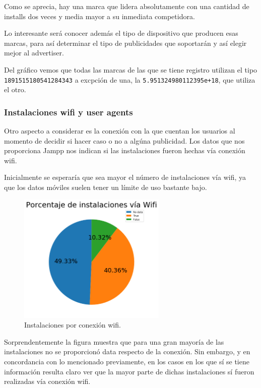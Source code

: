 \documentclass[a4paper, 12pt]{article}
\begin{document}
		Como se aprecia, hay una marca que lidera absolutamente con una cantidad de installs dos veces y media mayor a su inmediata competidora.

		Lo interesante será conocer además el tipo de dispositivo que producen esas marcas, para así determinar el tipo de publicidades que soportarán y así elegir mejor al advertiser.

		Del gráfico vemos que todas las marcas de las que se tiene registro utilizan el tipo \texttt{1891515180541284343} a excpción de una, la \texttt{5.951324980112395e+18}, que utiliza el otro.

	\subsubsection{Instalaciones wifi y user agents}

		Otro aspecto a considerar es la conexión con la que cuentan los usuarios al momento de decidir si hacer caso o no a algúna publicidad. Los datos que nos proporciona Jampp nos indican si las instalaciones fueron hechas vía conexión wifi.

		Inicialmente se esperaría que sea mayor el número de instalaciones vía wifi, ya que los datos móviles suelen tener un límite de uso bastante bajo.

		\FloatBarrier
		\begin{figure}[h]
			\centering
			\includegraphics[width=200pt]{images/installs/Wifi.png}
			\caption{Instalaciones por conexión wifi.}
		\end{figure}
		\FloatBarrier

		Sorprendentemente la figura muestra que para una gran mayoría de las instalaciones no se proporcionó data respecto de la conexión. Sin embargo, y en concordancia con lo mencionado previamente, en los casos en los que sí se tiene información resulta claro ver que la mayor parte de dichas instalaciones sí fueron realizadas vía conexión wifi.
\end{document}
